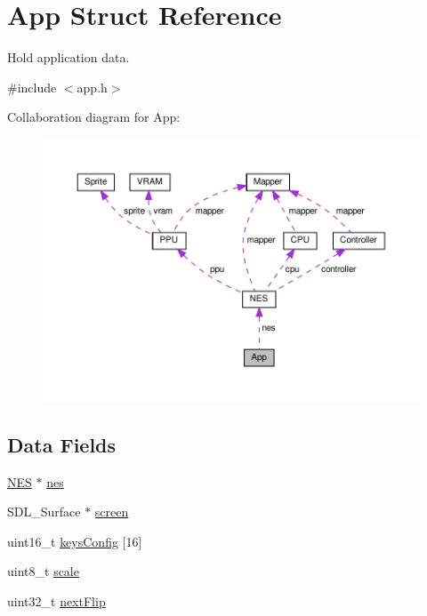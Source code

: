 \hypertarget{struct_app}{}\section{App Struct Reference}
\label{struct_app}


Hold application data.  




{\ttfamily \#include $<$app.\+h$>$}



Collaboration diagram for App\+:\nopagebreak
\begin{figure}[H]
\begin{center}
\leavevmode
\includegraphics[width=350pt]{struct_app__coll__graph}
\end{center}
\end{figure}
\subsection*{Data Fields}
\begin{DoxyCompactItemize}
\item 
\hyperlink{struct_n_e_s}{N\+ES} $\ast$ \hyperlink{struct_app_ad114e77101488c8e1bcc3a9dec07a54a}{nes}
\item 
S\+D\+L\+\_\+\+Surface $\ast$ \hyperlink{struct_app_a78fa3957d73de49cb81d047857504218}{screen}
\item 
uint16\+\_\+t \hyperlink{struct_app_ae6ca1436ec0a9fd20c44b9a789f748dd}{keys\+Config} \mbox{[}16\mbox{]}
\item 
uint8\+\_\+t \hyperlink{struct_app_a616c0a72f0e4af38b93c736773ac7210}{scale}
\item 
uint32\+\_\+t \hyperlink{struct_app_a08de9232616eaf6a59a7cf46e2b5f437}{next\+Flip}
\end{DoxyCompactItemize}


